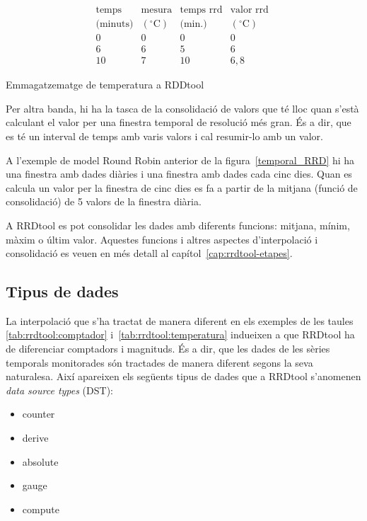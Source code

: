 \begin{table}[h]
  \centering
\[
\begin{array}{cc||cc}
\text{temps} & \text{mesura} & \text{temps rrd} & \text{valor rrd } \\
\text{(minuts)} & (^\circ\text{C}) & \text{(min.)} & (^\circ\text{C}) \\ \hline
0 & 0 & 0 & 0  \\
6 & 6 & 5 & 6 \\
10& 7 & 10& 6,8 
\end{array}
\]
  \caption{Emmagatzematge de temperatura a RDDtool}
  \label{tab:rrdtool:temperatura}
\end{table}



Per altra banda, hi ha la tasca de la consolidació de valors que té lloc quan s'està calculant el valor per una finestra temporal de resolució més gran. És a dir, que es té un interval de temps amb varis valors i cal resumir-lo amb un valor. 

A l'exemple de model Round Robin anterior de la figura~\ref{temporal_RRD} hi ha una finestra amb dades diàries i una finestra amb dades cada cinc dies. Quan es calcula un valor per la finestra de cinc dies es fa a partir de la mitjana (funció de consolidació) de 5 valors de la finestra diària.

A RRDtool es pot consolidar les dades amb diferents funcions: mitjana, mínim, màxim o últim valor. Aquestes funcions i altres aspectes d'interpolació i consolidació es veuen en més detall al capítol~\ref{cap:rrdtool-etapes}.



\subsection{Tipus de dades}\label{RRDtipus}

La interpolació que s'ha tractat de manera diferent en els exemples de les taules \ref{tab:rrdtool:comptador} i~\ref{tab:rrdtool:temperatura} indueixen a que RRDtool ha de diferenciar comptadors i magnituds.  És a dir, que les dades de les sèries temporals monitorades són tractades de manera diferent segons la seva naturalesa.
Així apareixen els següents tipus de dades que a RRDtool s'anomenen \emph{data source types} (DST):

\begin{itemize}

\item counter 
\item derive
\item absolute
\item gauge     
\item compute

\end{itemize}

